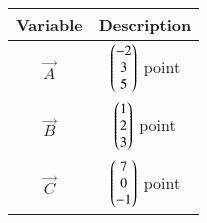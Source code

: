 \begin{tabular}[12pt]{ |c| c|}
    \hline
    \textbf{Variable} & \textbf{Description}\\ 
    \hline
	$\vec{A}$ & $\begin{pmatrix}-2\\3\\5\end{pmatrix}$ point\\
    \hline
	$\vec{B}$ & $\begin{pmatrix}1\\2\\3\end{pmatrix}$ point\\
    \hline
	$\vec{C}$ & $\begin{pmatrix}7\\0\\-1\end{pmatrix}$ point\\
    \hline

    \end{tabular}
